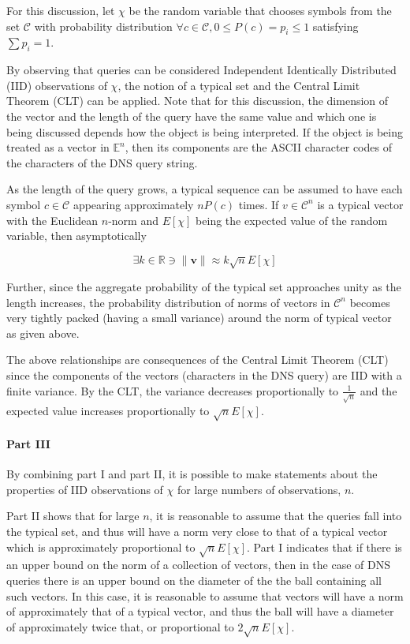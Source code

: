 \documentclass[12pt]{report}
\theoremstyle{remark}
\theoremstyle{definition}
\theoremstyle{definition}
\theoremstyle{definition}
\begin{document}
For this discussion, let $\chi$ be the random variable that chooses symbols from
the set $\mathcal C$ with probability distribution $\forall c\in\mathcal C,
0\leq P(c)=p_i\leq1$ satisfying $\sum{p_i}=1$.

By observing that queries can be considered Independent Identically Distributed
(IID) observations of $\chi$, the notion of a typical set and the Central Limit 
Theorem (CLT) can be applied. Note that for this discussion, the dimension of
the vector and the length of the query have the same value and which one is
being discussed depends how the object is being interpreted. If the object is
being treated as a vector in $\mathbb E^n$, then its components are the ASCII
character codes of the characters of the DNS query string.

As the length of the query grows, a typical sequence can be assumed to have each
symbol $c\in\mathcal C$ appearing approximately $nP(c)$ times. If $v\in\mathcal
C^n$ is a typical vector with the Euclidean $n$-norm and $E[\chi]$
being the expected value of the random variable, then asymptotically

\begin{equation}
\label{dnssampling-evgrowth-eq}
\exists k\in\mathbb R \ni \|\mathbf v\|\approx k\sqrt n E[\chi]
\end{equation}

Further, since the aggregate probability of the typical set approaches unity as
the length increases, the probability distribution of norms of vectors in
$\mathcal C^n$ becomes very tightly packed (having a small variance) around the
norm of typical vector as given above.

The above relationships are consequences of the Central Limit Theorem (CLT)
since the components of the vectors (characters in the DNS query) are IID with a
finite variance. By the CLT, the variance decreases proportionally to
$\frac{1}{\sqrt n}$ and the expected value increases proportionally to
$\sqrt{n}E[\chi]$.

\paragraph{Part III} By combining part I and part II, it is possible to make
statements about the properties of IID observations of $\chi$ for large numbers
of observations, $n$.

Part II shows that for large $n$, it is reasonable to assume that the queries
fall into the typical set, and thus will have a norm very close to that of a
typical vector which is approximately proportional to $\sqrt{n}E[\chi]$. Part I
indicates that if there is an upper bound on the norm of a collection of
vectors, then in the case of DNS queries there is an upper bound on the diameter
of the the ball containing all such vectors. In this case, it is reasonable to
assume that vectors will have a norm of approximately that of a typical vector,
and thus the ball will have a diameter of approximately twice that, or
proportional to $2\sqrt{n}E[\chi]$.
\end{document}
